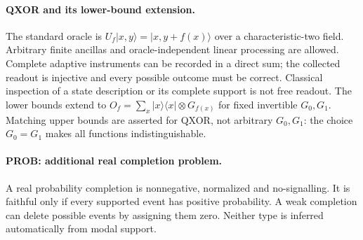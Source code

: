 \paragraph{QXOR and its lower-bound extension.}
The standard oracle is
$U_f\lvert x,y\rangle=\lvert x,y+f(x)\rangle$ over a characteristic-two field.
Arbitrary finite ancillas and oracle-independent linear processing are allowed.
Complete adaptive instruments can be recorded in a direct sum; the collected
readout is injective and every possible outcome must be correct. Classical
inspection of a state description or its complete support is not free readout.
The lower bounds extend to
$O_f=\sum_x\lvert x\rangle\langle x\rvert\otimes G_{f(x)}$ for fixed invertible
$G_0,G_1$. Matching upper bounds are asserted for QXOR, not arbitrary
$G_0,G_1$: the choice $G_0=G_1$ makes all functions indistinguishable.

\paragraph{PROB: additional real completion problem.}
A real probability completion is nonnegative, normalized and no-signalling.
It is faithful only if every supported event has positive probability. A weak
completion can delete possible events by assigning them zero. Neither type is
inferred automatically from modal support.
